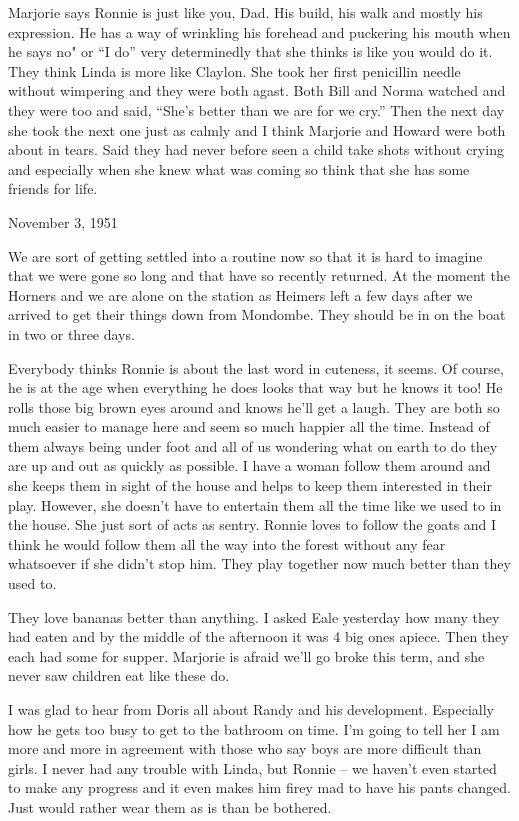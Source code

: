\documentclass[]{book}
\begin{document}
Marjorie says Ronnie is just like you, Dad. His build, his walk and mostly his expression. He has a way of wrinkling his forehead and puckering his mouth when he says
no" or ``I do'' very determinedly that she thinks is like you would do it. They think Linda is more like Claylon. She took her first penicillin needle without wimpering and they were both agast. Both Bill and Norma watched and they were too and said, ``She's better than we are for we cry.'' Then the next day she took the next one just as calmly and I think Marjorie and Howard were both about in tears. Said they had never before seen a child take shots without crying and especially when she knew what was coming so think that she has some friends for life.

November 3, 1951

We are sort of getting settled into a routine now so that it is hard to imagine that we were gone so long and that have so recently returned. At the moment the Horners and we are alone on the station as Heimers left a few days after we arrived to get their things down from Mondombe. They should be in on the boat in two or three days.

Everybody thinks Ronnie is about the last word in cuteness, it seems. Of course, he is at the age when everything he does looks that way but he knows it too! He rolls those big brown eyes around and knows he'll get a laugh. They are both so much easier to manage here and seem so much happier all the time. Instead of them always being under foot and all of us wondering what on earth to do they are up and out as quickly as possible. I have a woman follow them around and she keeps them in sight of the house and helps to keep them interested in their play. However, she doesn't have to entertain them all the time like we used to in the house. She just sort of acts as sentry. Ronnie loves to follow the goats and I think he would follow them all the way into the forest without any fear whatsoever if she didn't stop him. They play together now much better than they used to.

They love bananas better than anything. I asked Eale yesterday how many they had eaten and by the middle of the afternoon it was 4 big ones apiece. Then they each had some for supper. Marjorie is afraid we'll go broke this term, and she never saw children eat like these do.

I was glad to hear from Doris all about Randy and his development. Especially how he gets too busy to get to the bathroom on time. I'm going to tell her I am more and more in agreement with those who say boys are more difficult than girls. I never had any trouble with Linda, but Ronnie -- we haven't even started to make any progress and it even makes him firey mad to have his pants changed. Just would rather wear them as is than be bothered.
\end{document}
